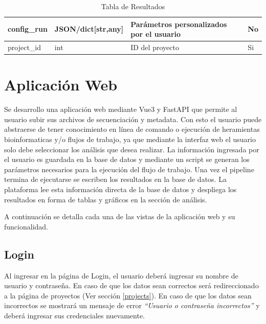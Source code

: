 \begin{table}[H]
\begin{tabular}{|l|l|l|l|}
    config\_run            & JSON/dict{[}str,any{]} & Parámetros personalizados por el usuario                                                                                                                 & No \\ \hline
    project\_id            & int                    & ID del proyecto                                                                                                                                          & Si \\ \hline
    \end{tabular}
    \caption{Tabla de Resultados}
    \label{tab:db-results}
    \end{table}

\newpage
\section{Aplicación Web}
Se desarrollo una aplicación web mediante Vue3 y FastAPI que permite al usuario subir sus archivos de secuenciación y metadata. 
Con esto el usuario puede abstraerse de tener conocimiento en línea de comando o ejecución de heramientas bioinformaticas y/o flujos de trabajo, 
ya que mediante la interfaz web el usuario solo debe seleccionar los análisis que desea realizar.
La información ingresada por el usuario es guardada en la base de datos y mediante un script se generan los parámetros necesarios para la ejecución del flujo de trabajo.
Una vez el pipeline termina de ejecutarse se escriben los resultados en la base de datos. 
La plataforma lee esta información directa de la base de datos y despliega los resultados en forma de tablas y gráficos en la sección de análisis.

A continuación se detalla cada una de las vistas de la aplicación web y su funcionalidad.

\subsection{Login}
Al ingresar en la página de Login, el usuario deberá ingresar su nombre de usuario y contraseña.
En caso de que los datos sean correctos será redireccionado a la página de proyectos (Ver sección \ref{projects}).
En caso de que los datos sean incorrectos se mostrará un mensaje de error \textit{“Usuario o contraseña incorrectos”} y deberá ingresar sus credenciales nuevamente.


